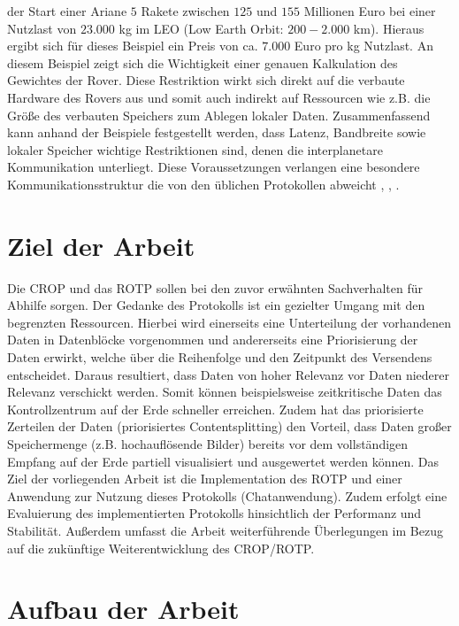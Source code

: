 der Start einer Ariane $5$ Rakete zwischen $125$ und $155$ Millionen Euro bei 
einer Nutzlast von $23.000$ kg im LEO (Low Earth Orbit: $200-2.000$ km).
Hieraus ergibt sich f{\"u}r dieses Beispiel ein Preis von ca. $7.000$ Euro pro kg 
Nutzlast. An diesem Beispiel zeigt sich die Wichtigkeit einer genauen
Kalkulation des Gewichtes der Rover. Diese Restriktion wirkt sich direkt auf die
verbaute Hardware des Rovers aus und somit auch indirekt auf Ressourcen wie z.B.
die Gr{\"o}{\ss}e des verbauten Speichers zum Ablegen lokaler Daten.\newline
Zusammenfassend kann anhand der Beispiele festgestellt werden, dass Latenz, 
Bandbreite sowie lokaler Speicher wichtige Restriktionen sind, denen die 
interplanetare Kommunikation unterliegt. Diese Voraussetzungen verlangen 
eine besondere Kommunikationsstruktur die von den {\"u}blichen Protokollen 
abweicht \cite{web5}, \cite{web12}, \cite{web13}. 

\section{Ziel der Arbeit}

Die \gls{CROP} und das \gls{ROTP} sollen bei den zuvor erw{\"a}hnten
Sachverhalten f{\"u}r Abhilfe sorgen. Der Gedanke des Protokolls ist ein gezielter Umgang mit den begrenzten 
Ressourcen. Hierbei wird einerseits eine Unterteilung der vorhandenen 
Daten in Datenbl{\"o}cke vorgenommen und andererseits eine Priorisierung der 
Daten erwirkt, welche {\"u}ber die Reihenfolge und den Zeitpunkt des 
Versendens entscheidet. Daraus resultiert, dass Daten von hoher Relevanz 
vor Daten niederer Relevanz verschickt werden. Somit k{\"o}nnen 
beispielsweise zeitkritische Daten das Kontrollzentrum auf der Erde 
schneller erreichen. Zudem hat das priorisierte Zerteilen der Daten
(priorisiertes Contentsplitting) den Vorteil, dass Daten gro{\ss}er
Speichermenge (z.B.
hochaufl{\"o}sende Bilder) bereits vor dem vollst{\"a}ndigen Empfang auf der
Erde partiell visualisiert und ausgewertet werden k{\"o}nnen. Das Ziel der
vorliegenden Arbeit ist die Implementation des \gls{ROTP} und einer Anwendung
zur Nutzung dieses Protokolls (Chatanwendung). Zudem erfolgt eine Evaluierung
des implementierten Protokolls hinsichtlich der Performanz und Stabilit{\"a}t.
Au{\ss}erdem umfasst die Arbeit weiterf{\"u}hrende {\"U}berlegungen im Bezug auf
die zuk{\"u}nftige Weiterentwicklung des \gls{CROP}/\gls{ROTP}.

\section{Aufbau der Arbeit}

